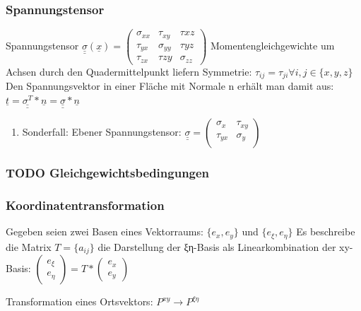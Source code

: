\documentclass[11pt]{article}
\begin{document}
\subsubsection{Spannungstensor}
\label{sec:orga1f1463}
Spannungstensor \(\underline{\underline{\sigma}}(\underline{x}) = \begin{pmatrix}
\sigma_{xx} & \tau_{xy} & \tau{xz}\\
\tau_{yx} & \sigma_{yy} & \tau{yz}\\
\tau_{zx} & \tau{zy} & \sigma_{zz}
\end{pmatrix}\)
Momentengleichgewichte um Achsen durch den Quadermittelpunkt liefern Symmetrie:
\(\tau_{ij} = \tau_{ji} \forall i,j \in \{x,y,z\}\)
Den Spannungsvektor in einer Fläche mit Normale n erhält man damit aus:
\(\underline{t} = \underline{\underline{\sigma^T}} * \underline{n} =  \underline{\underline{\sigma}} * \underline{n}\)
\begin{enumerate}
\item Sonderfall: Ebener Spannungstensor:
\label{sec:orgbc1812b}
\(\underline{\underline{\sigma}} = \begin{pmatrix}
\sigma_{x} & \tau_{xy} \\
\tau_{yx} & \sigma_{y} \\
\end{pmatrix}\)
\end{enumerate}
\subsubsection{{\bfseries\sffamily TODO} Gleichgewichtsbedingungen}
\label{sec:orgc3eec5b}

\subsubsection{Koordinatentransformation}
\label{sec:orgcda05bd}
Gegeben seien zwei Basen eines Vektorraums: \(\{e_x,e_y\}\) und \(\{e_{\xi},e_{\eta}\}\)
Es beschreibe die Matrix \(T = \{a_{ij}\}\) die Darstellung der ξη-Basis als Linearkombination der xy-Basis:
\(\begin{pmatrix} e_{\xi} \\ e_{\eta}\end{pmatrix} = T * \begin{pmatrix} e_{x} \\ e_{y}\end{pmatrix}\)

Transformation eines Ortsvektors: \(P^{xy} \rightarrow P^{\xi \eta}\)
\end{document}
